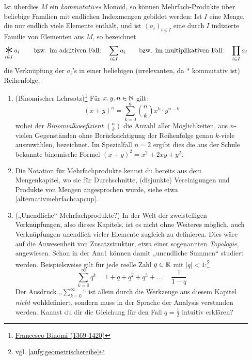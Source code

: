 \begin{nota}
    Ist überdies $M$ ein \emph{kommutatives} Monoid, so können Mehrfach-Produkte über beliebige Familien mit endlichen Indexmengen gebildet werden: Ist $I$ eine Menge, die nur endlich viele Elemente enthält, und ist $(a_i)_{i\in I}$ eine durch $I$ indizierte Familie von Elementen aus $M$, so bezeichnet
        \[ \mathop{\raisebox{-0.6ex}{\scalebox{2.5}{$*$}}}_{i\in I} a_i \qquad\text{bzw. im additiven Fall:}\quad \sum_{i\in I} a_i \qquad\text{bzw. im multiplikativen Fall:}\quad \prod_{i\in I} a_i\]
    die Verknüpfung der $a_i$'s in einer beliebigen (irrelevanten, da $*$ kommutativ ist) Reihenfolge.
\end{nota}


\begin{bsp} \quad
    \begin{enumerate}
        \item(Binomischer Lehrsatz)\footnote{\href{https://www.youtube.com/watch?v=dQw4w9WgXcQ}{Francesco Binomi (1369-1420)}} Für $x,y,n\in \mathbb N$ gilt:
            \[ (x+y)^n = \sum_{k=0}^n \binom{n}{k} x^k\cdot y^{n-k} \]
        wobei der \emph{Binomialkoeefizient} $\binom{n}{k}$ die Anzahl aller Möglichkeiten, aus $n$-vielen Gegenständen ohne Berücksichtigung der Reihenfolge genau $k$-viele auszuwählen, bezeichnet. Im Spezialfall $n=2$ ergibt dies die aus der Schule bekannte binomische Formel $(x+y)^2=x^2+2xy+y^2$.
        \item Die Notation für Mehrfachprodukte kennst du bereits aus dem Mengenkapitel, wo sie für Durchschnitte, (disjunkte) Vereinigungen und Produkte von Mengen angesprochen wurde, siehe etwa \cref{alternativmehrfachcapcup}.
        \item(„Unendliche“ Mehrfachprodukte?) In der Welt der zweistelligen Verknüpfungen, also dieses Kapitels, ist es nicht ohne Weiteres möglich, auch Verknüpfungen unendlich vieler Elemente zugleich zu definieren. Dies wäre auf die Anwesenheit von Zusatzstruktur, etwa einer sogenannten \emph{Topologie}, angewiesen. Schon in der Ana1 können damit „unendliche Summen“ studiert werden. Beispielsweise gilt für jede reelle Zahl $q\in \mathbb R$ mit $\vert q\vert < 1$:\footnote{vgl. \cref{aufg:geometrischereihe}}
            \[ \sum_{k=0}^\infty q^k = 1 + q + q^2 + q^3 + \ldots = \frac{1}{1-q} \]
        Der Ausdruck „$\sum_{k=0}^\infty$“ ist allein durch die Werkzeuge aus diesem Kapitel \emph{nicht} wohldefiniert, sondern muss in der Sprache der Analysis verstanden werden. Kannst du dir die Gleichung für den Fall $q=\frac{1}{2}$ intuitiv erklären?
    \end{enumerate}
\end{bsp}





